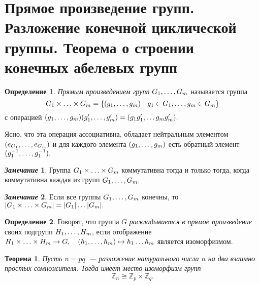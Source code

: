 \documentclass[a4paper, 14pt]{extarticle}
\newcommand{\n}{\par}
\newcommand{\integers}{\mathbb{Z}}
\theoremstyle{definition}
\newtheorem*{remark}{\textit{Замечание}}
\newtheorem{definition}{Определение}
\theoremstyle{plain}
\newtheorem*{theorem*}{Теорема}
\numberwithin{theorem}{section}
\numberwithin{definition}{section}
\numberwithin{statement}{section}
\numberwithin{lemma}{section}
\numberwithin{consequence}{section}
\begin{document}
	\section{Прямое произведение групп. Разложение конечной циклической группы. Теорема о строении конечных абелевых групп}
		\setcounter{definition}{0}
		\begin{definition}
			\textit{Прямым произведением групп} $G_1, \mathellipsis, G_m$ называется группа
			\begin{equation*}
				G_1 \times \mathellipsis \times G_m = \{(g_1, \mathellipsis, g_m) \ | \ g_1 \in G_1, \mathellipsis, g_m \in G_m\}
			\end{equation*}
			с операцией $(g_1, \mathellipsis, g_m)(g'_1, \mathellipsis, g'_m) = (g_1g'_1, \mathellipsis g_mg'_m).$ \n
			Ясно, что эта операция ассоциативна, обладает нейтральным элементом $(e_{G_1}, \mathellipsis, e_{G_m})$ и для каждого элемента $(g_1, \mathellipsis, g_m)$ есть обратный элемент $(g^{-1}_1, \mathellipsis, g^{-1}_1).$
		\end{definition}
		\begin{remark}
			Группа $G_1 \times \mathellipsis \times G_m$ коммутативна тогда и только тогда, когда коммутативна каждая из групп $G_1, \mathellipsis, G_m.$
		\end{remark}
		\begin{remark}
			Если все группы ${G_1, \mathellipsis, G_m}$ конечны, то ${|G_1 \times \mathellipsis \times G_m| = |G_1| \mathellipsis |G_m|.}$
		\end{remark}
		\begin{definition}
			Говорят, что группа $G$ \textit{раскладывается в прямое произведение} своих подгрупп ${H_1, \mathellipsis, H_m}$, если отображение
			${H_1 \times \mathellipsis \times H_m \rightarrow G, \quad (h_1, \mathellipsis, h_m) \mapsto h_1 \mathellipsis h_m}$ является изоморфизмом.
		\end{definition}
		\begin{theorem*}
			Пусть ${n = pq}$~--- разложение натурального числа $n$ на два взаимно простых сомножителя. Тогда имеет место изоморфизм групп
			\begin{equation*}
				\integers_n \cong \integers_p \times \integers_q.
			\end{equation*}
		\end{theorem*}
		\newpage
\end{document}
